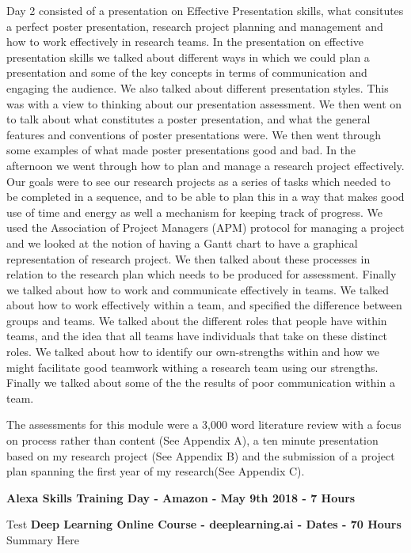 \documentclass{article}
\begin{document}
	Day 2 consisted of a presentation on Effective Presentation skills, what consitutes a perfect poster presentation, research project planning and management and how to work effectively in research teams. In the presentation on effective presentation skills we talked about different ways in which we could plan a presentation and some of the key concepts in terms of communication and engaging the audience. We also talked about different presentation styles. This was with a view to thinking about our presentation assessment. We then went on to talk about what constitutes a poster presentation, and what the general features and conventions of poster presentations were. We then went through some examples of what made poster presentations good and bad. In the afternoon we went through how to plan and manage a research project effectively. Our goals were to see our research projects as a series of tasks which needed to be completed in a sequence, and to be able to plan this in a way that makes good use of time and energy as well a mechanism for keeping track of progress. We used the Association of Project Managers (APM) protocol for managing a project and we looked at the notion of having a Gantt chart to have a graphical representation of research project. We then talked about these processes in relation to the research plan which needs to be produced for assessment. Finally we talked about how to work and communicate effectively in teams. We talked about how to work effectively within a team, and specified the difference between groups and teams. We talked about the different roles that people have within teams, and the idea that all teams have individuals that take on these distinct roles. We talked about how to identify our own-strengths within and how we might facilitate good teamwork withing a research team using our strengths. Finally we talked about some of the the results of poor communication within a team.
	\newline
	\par
	The assessments for this module were a 3,000 word literature review with a focus on process rather than content (See Appendix A), a ten minute presentation based on my research project (See Appendix B) and the submission of a project plan spanning the first year of my research(See Appendix C).  
	\newline
	\par
	\textbf{Alexa Skills Training Day - Amazon - May 9th 2018 - 7 Hours}
	\newline
	\par
	Test
	\newline
	\textbf{Deep Learning Online Course - deeplearning.ai - Dates - 70 Hours}
	Summary Here
\end{document}
